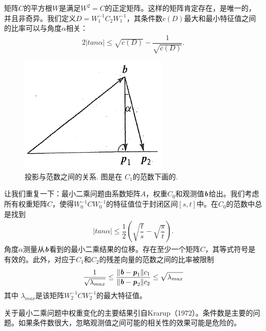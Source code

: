 矩阵$C$的平方根$W$是满足$W^{2}=C$的正定矩阵。这样的矩阵肯定存在，是唯一的，并且非奇异。我们定义$ D = W^{-1}_{1}C_{2}W^{-1}_{1}$，其条件数$c(D)$最大和最小特征值之间的比率可以与角度$ \alpha$相关：
\begin{align}
2\lvert tan\alpha \rvert \leq \sqrt{c(D)} - \dfrac{1}{\sqrt{c(D)}}.
\end{align}

\begin{figure}[!h]
	\centering
	\includegraphics[height=0.23\linewidth]{TeX_files/Part02/chapter06/image/6-2}
	\caption{投影与范数之间的关系. 图是在 $C_{1}$的范数下画的.}
\end{figure}

让我们重复一下：最小二乘问题由系数矩阵$A$，权重$C_{0}$和观测值$\textbf{\textit{b}}$给出。我们考虑所有权重矩阵$C$，使得$ W^{-1}_{0}CW^{-1}_{0}$的特征值位于封闭区间$[s,t]$中。在$C_{0}$的范数中总是找到
\begin{align}
\lvert tan \alpha \rvert \leq \dfrac{1}{2} (\sqrt{\dfrac{t}{s}} - \sqrt{\dfrac{s}{t}}).
\end{align}
角度$ \alpha$测量从$\textbf{\textit{b}}$看到的最小二乘结果的位移。存在至少一个矩阵$C$，其等式符号是有效的。此外，对应于$C_{1}$和$C_{2}$的残差向量的范数之间的比率被限制
\begin{align}
\dfrac{1}{\sqrt{\lambda_{max}}} \leq \dfrac{\rVert \textbf{\textit{b}} - \textbf{\textit{p}}_{1}\rVert c_{1}}{\rVert \textbf{\textit{b}} - \textbf{\textit{p}}_{2}\rVert c_{2}} \leq \sqrt{\lambda_{max}}
\end{align}
其中 $ \lambda_{max}$是该矩阵$ W^{-1}_{2}CW^{-1}_{2}$的最大特征值。

关于最小二乘问题中权重变化的主要结果引自Krarup（1972）。条件数是主要的问题。如果条件数很大，忽略观测值之间可能的相关性的效果可能是危险的。

